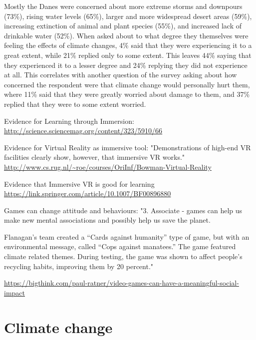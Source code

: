     Mostly the Danes were concerned about more extreme storms and downpours (73\%), rising water levels (65\%), larger and more widespread desert areas (59\%), increasing extinction of animal and plant species (55\%), and increased lack of drinkable water (52\%)\cite{concito}. When asked about to what degree they themselves were feeling the effects of climate changes, 4\% said that they were experiencing it to a great extent, while 21\% replied only to some extent\cite{concito}. This leaves 44\% saying that they experienced it to a lesser degree and 24\% replying they did not experience at all\cite{concito}. This correlates with another question of the survey asking about how concerned the respondent were that climate change would personally hurt them, where 11\% said that they were greatly worried about damage to them, and 37\% replied that they were to some extent worried\cite{concito}.


Evidence for Learning through Immersion:
\url{http://science.sciencemag.org/content/323/5910/66}

Evidence for Virtual Reality as immersive tool:
"Demonstrations of high-end VR facilities clearly show, however, that immersive VR works."
\url{http://www.cs.rug.nl/~roe/courses/OriInf/Bowman-Virtual-Reality}

Evidence that Immersive VR is good for learning
\url{https://link.springer.com/article/10.1007/BF00896880}

Games can change attitude and behaviours:
"3. Associate - games can help us make new mental associations and possibly help us save the planet.

Flanagan’s team created a “Cards against humanity” type of game, but with an environmental message, called “Cops against manatees.” The game featured climate related themes. During testing, the game was shown to affect people’s recycling habits, improving them by 20 percent."

\url{https://bigthink.com/paul-ratner/video-games-can-have-a-meaningful-social-impact}

\section{Climate change}
    
